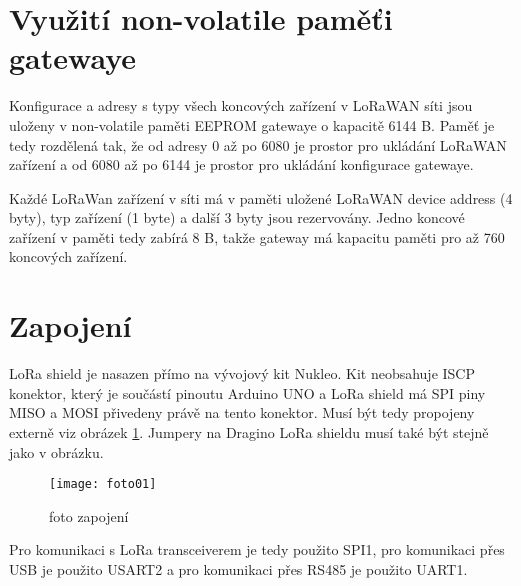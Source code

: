 \section{Využití non-volatile paměťi gatewaye}
Konfigurace a adresy s typy všech koncových zařízení v LoRaWAN síti jsou uloženy v non-volatile paměti EEPROM gatewaye o kapacitě 6144 B. 
Paměť je tedy rozdělená tak, že od adresy 0 až po 6080 je prostor pro ukládání LoRaWAN zařízení a od 6080 až po 6144 je prostor pro ukládání konfigurace gatewaye.

Každé LoRaWan zařízení v síti má v paměti uložené LoRaWAN device address (4 byty), typ zařízení (1 byte) a další 3 byty jsou rezervovány. 
Jedno koncové zařízení v paměti tedy zabírá  8 B, takže gateway má kapacitu paměti pro až 760 koncových zařízení.


\section{Zapojení}
LoRa shield \cite{draginoWiki} je nasazen přímo na vývojový kit Nukleo. Kit neobsahuje ISCP konektor, který je součástí pinoutu Arduino UNO a LoRa shield má SPI piny MISO a MOSI přivedeny právě na tento konektor. Musí být tedy propojeny externě viz obrázek \ref{fig:03}. Jumpery na Dragino LoRa shieldu musí také být stejně jako v obrázku.

\begin{figure}[!h]
    \centering
    \texttt{[image: foto01]}
    \caption{foto zapojení}
    \label{fig:03}
\end{figure}

Pro komunikaci s LoRa transceiverem je tedy použito SPI1, pro komunikaci přes USB je použito USART2 a pro komunikaci přes RS485 je použito UART1.

